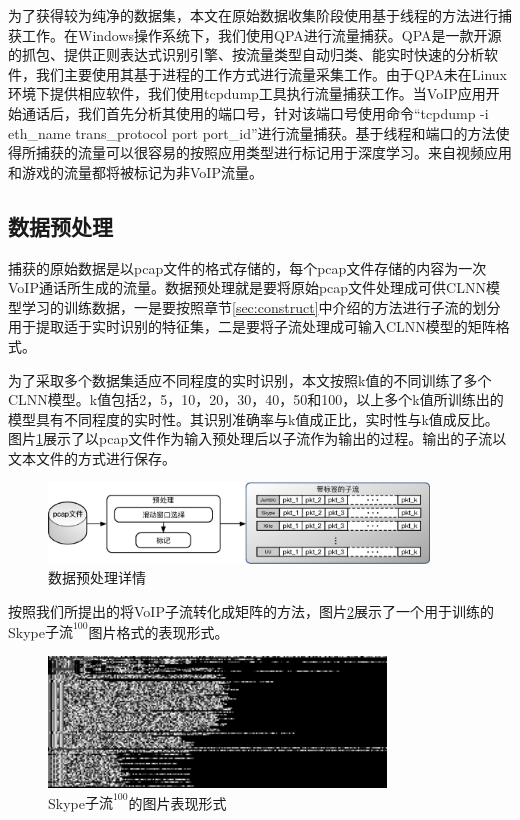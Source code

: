 为了获得较为纯净的数据集，本文在原始数据收集阶段使用基于线程的方法进行捕获工作。在Windows操作系统下，我们使用QPA进行流量捕获。QPA是一款开源的抓包、提供正则表达式识别引擎、按流量类型自动归类、能实时快速的分析软件，我们主要使用其基于进程的工作方式进行流量采集工作。由于QPA未在Linux环境下提供相应软件，我们使用tcpdump工具执行流量捕获工作。当VoIP应用开始通话后，我们首先分析其使用的端口号，针对该端口号使用命令“tcpdump -i eth\_name trans\_protocol port port\_id”进行流量捕获。基于线程和端口的方法使得所捕获的流量可以很容易的按照应用类型进行标记用于深度学习。来自视频应用和游戏的流量都将被标记为非VoIP流量。


\subsection{数据预处理}
捕获的原始数据是以pcap文件的格式存储的，每个pcap文件存储的内容为一次VoIP通话所生成的流量。数据预处理就是要将原始pcap文件处理成可供CLNN模型学习的训练数据，一是要按照章节\ref{sec:construct}中介绍的方法进行子流的划分用于提取适于实时识别的特征集，二是要将子流处理成可输入CLNN模型的矩阵格式。

为了采取多个数据集适应不同程度的实时识别，本文按照k值的不同训练了多个CLNN模型。k值包括2，5，10，20，30，40，50和100，以上多个k值所训练出的模型具有不同程度的实时性。其识别准确率与k值成正比，实时性与k值成反比。图片\ref{fig:datasetprocessing}展示了以pcap文件作为输入预处理后以子流作为输出的过程。输出的子流以文本文件的方式进行保存。

\begin{figure}[htp]
\begin{center}
\includegraphics[width=0.9\textwidth]{figures/datasetprocessing.eps}
\caption{数据预处理详情}\label{fig:datasetprocessing}
\end{center}
\end{figure}



按照我们所提出的将VoIP子流转化成矩阵的方法，图片\ref{fig:skype1}展示了一个用于训练的Skype$\text{子流}^{100}$图片格式的表现形式。

\begin{figure}[htp]
\begin{center}
\includegraphics[width=0.8\textwidth]{figures/skype1.png}
\caption{Skype$\text{子流}^{100}$的图片表现形式}\label{fig:skype1}
\end{center}
\end{figure}

